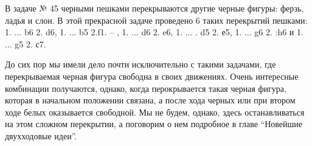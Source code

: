 В задаче № 45 черными пешками перекрываются другие черные фигуры: ферзь, ладья и слон. В этой прекрасной задаче проведено 6 таких перекрытий пешками: 1. ... b6 2. \knight{}d6\mate{}, 1. ... b5 2.\queen{}f1\mate{}. -- , 1. ... d6 2. \queen{}e6\mate{}, 1. ... . d5 2. \rook{}е5\mate{}, 1. ... g6 2. \knight:h6\mate{} и 1. ... g5 2. \knight{}с7\mate{}.

До сих пор мы имели дело почти исключительно с такими задачами, где перекрываемая черная фигура свободна в своих движениях. Очень интересные комбинации получаются, однако, когда перокрывается такая черная фигура, которая в начальном положении связана, а после хода черных или при втором ходе белых оказывается свободной. Мы не будем, однако, здесь останавливаться на этом сложном перекрытии, а поговорим о нем подробное в главе ``Новейшие двухходовые идеи''.
